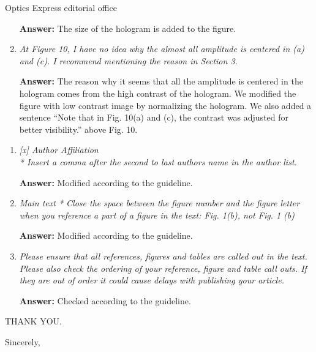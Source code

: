 \documentclass[a4paper,11pt]{letter}
\begin{document}
\begin{letter}{Optics Express editorial office}
\begin{enumerate}
\bigskip
\textbf{Answer:} 
The size of the hologram is added to the figure.


\item \textit{At Figure 10, I have no idea why the almost all amplitude is centered in (a) and (c). I recommend mentioning the reason in Section 3.}

\bigskip
\textbf{Answer:} 
The reason why it seems that all the amplitude is centered in the hologram comes from the high contrast of the hologram. We modified the figure with low contrast image by normalizing the hologram. We also added a sentence “Note that in Fig. 10(a) and (c), the contrast was adjusted for better visibility.” above Fig. 10.

\end{enumerate}

{}
\begin{enumerate}

\item \textit{[x] Author Affiliation \\
* Insert a comma after the second to last authors name in the author list.}

\bigskip
\textbf{Answer:}
Modified according to the guideline.


\item \textit{Main text
* Close the space between the figure number and the figure letter when you reference a part of a figure in the text: Fig. 1(b), not Fig. 1 (b)}

\bigskip
\textbf{Answer:}
Modified according to the guideline.

\item \textit{Please ensure that all references, figures and tables are called out in the text. Please also check the ordering of your reference, figure and table call outs. If they are out of order it could cause delays with publishing your article.}

\bigskip
\textbf{Answer:}
Checked according to the guideline.

\end{enumerate}

THANK YOU.

\vskip 2mm

\closing{Sincerely,}

\end{letter}
\end{document}
